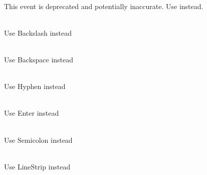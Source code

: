 \begin{DoxyRefList}
\item[Struct \doxylink{structsf_1_1_event_1_1_mouse_wheel_event}{sf\+::Event\+::Mouse\+Wheel\+Event} ]\hfill \\
\label{deprecated__deprecated000023}%
%
This event is deprecated and potentially inaccurate. Use  instead. 
\item[Member \doxylink{classsf_1_1_keyboard_acb4cacd7cc5802dec45724cf3314a142a536df84e73859aa44e11e192459470b6}{sf\+::Keyboard\+::Back\+Slash} ]\hfill \\
\label{deprecated__deprecated000026}%
%
Use Backslash instead  
\item[Member \doxylink{classsf_1_1_keyboard_acb4cacd7cc5802dec45724cf3314a142a33aeaab900abcd01eebf2fcc4f6d97e2}{sf\+::Keyboard\+::Back\+Space} ]\hfill \\
\label{deprecated__deprecated000025}%
%
Use Backspace instead  
\item[Member \doxylink{classsf_1_1_keyboard_acb4cacd7cc5802dec45724cf3314a142a401a183dcfde0a06cb60fe6c91fa1e39}{sf\+::Keyboard\+::Dash} ]\hfill \\
\label{deprecated__deprecated000024}%
%
Use Hyphen instead  
\item[Member \doxylink{classsf_1_1_keyboard_acb4cacd7cc5802dec45724cf3314a142ac291de81bdee518d636bc359f2ca77de}{sf\+::Keyboard\+::Return} ]\hfill \\
\label{deprecated__deprecated000028}%
%
Use Enter instead  
\item[Member \doxylink{classsf_1_1_keyboard_acb4cacd7cc5802dec45724cf3314a142a460ab09a36f9ed230504b89b9815de88}{sf\+::Keyboard\+::Semi\+Colon} ]\hfill \\
\label{deprecated__deprecated000027}%
%
Use Semicolon instead  
\item[Member \doxylink{group__graphics_gga5ee56ac1339984909610713096283b1ba5b09910f5d0f39641342184ccd0d1de3}{sf\+::Lines\+Strip} ]\hfill \\
\label{deprecated__deprecated000006}%
%
Use Line\+Strip instead  
\item[Member \doxylink{classsf_1_1_render_texture_a0e945c4ce7703591c7f240b169744603}{sf\+::Render\+Texture\+::create} (unsigned int width, unsigned int height, bool depth\+Buffer)]\hfill \\

\end{DoxyRefList}
